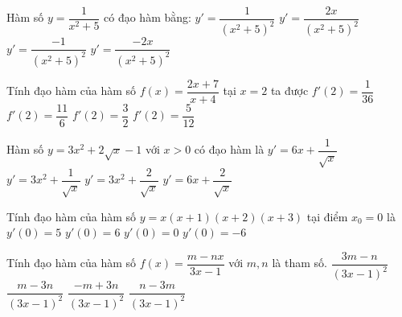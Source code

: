 \begin{ex}%
	 Hàm số $y=\dfrac{1}{x^2+5}$ có đạo hàm bằng:
	\choice 
		{$y'=\dfrac{1}{\left(x^2+5\right)^2}$} 
		 {$y'=\dfrac{2x}{\left(x^2+5\right)^2}$}
		 {$y'=\dfrac{-1}{\left(x^2+5\right)^2}$}
		 {\True $y'=\dfrac{-2x}{\left(x^2+5\right)^2}$}
\end{ex}

\begin{ex}%
	Tính đạo hàm của hàm số $f(x)=\dfrac{2x+7}{x+4}$ tại $x=2$ ta  được
	 \choice
		{\True  $f'\left(2\right)=\dfrac{1}{36}$}
		{$f'\left(2\right)=\dfrac{11}{6}$} 
		 {$f'\left(2\right)=\dfrac{3}{2}$}
		 {$f'\left(2\right)=\dfrac{5}{12}$}
\end{ex}

\begin{ex}%
	Hàm số $y=3x^2+2\sqrt{x}-1$ với $x>0$ có đạo  hàm là
	 \choice
		{\True $y'=6x+\dfrac{1}{\sqrt{x}}$} 
		{$y'=3x^2+\dfrac{1}{\sqrt{x}}$} 
		{$y'=3x^2+\dfrac{2}{\sqrt{x}}$} 
		{$y'=6x+\dfrac{2}{\sqrt{x}}$} 
\end{ex}

\begin{ex}%
	Tính đạo hàm của hàm số $y=x\left(x+1\right)\left(x+2\right)\left(x+3\right)$ tại điểm  $x_0=0$ là
	 \choice
		 {$y'\left(0\right)=5$}
		{\True $y'\left(0\right)=6$} 
		{$y'\left(0\right)=0$} 
		{$y'\left(0\right)=-6$} 
\end{ex}

\begin{ex}%
	Tính đạo hàm  của hàm số $f(x)=\dfrac{m-nx}{3x-1}$ với $m, n$ là tham số.
	\choice 
		 {$\dfrac{3m-n}{(3x-1)^2}$}
		{$\dfrac{m-3n}{(3x-1)^2}$} 
		{$\dfrac{-m+3n}{(3x-1)^2}$} 
		{\True  $\dfrac{n-3m}{(3x-1)^2}$}
\end{ex}

